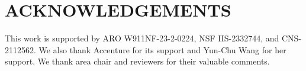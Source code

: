 \section{ACKNOWLEDGEMENTS\label{acknowledgement}}
This work is supported by ARO W911NF-23-2-0224, NSF IIS-2332744, and CNS-2112562. We also thank Accenture for its support and Yun-Chu Wang for her support. We thank area chair and reviewers for their valuable comments.

\begin{comment}
We demonstrated that Dynamically Selected Anterograde Amnesia offers the best trade-off among methods like Error Injection, Empty Response, Unlearning, and DEPN for protecting phone numbers, based on PII risk score and exact match score. It also excels in safeguarding physical addresses. We found that Sensitivity Analysis, Selected Unlearning, and Error Injection are all indispensable steps. Our work improves the PII risk score when more than one index is selected for forgetting, but selecting too many indexes deteriorates model performance. The break-even point for unlearning is between 200 and 400 data points. Overall, it effectively protects PII while maintaining model performance.
\end{comment}


\begin{comment}
\textbf{Limitation and Future work.}
Our study utilized the LLaMA2-7b model, chosen for its strong generalization capabilities and due to computational constraints. The experiments were performed using the Enron email dataset, widely acknowledged as suitable for data extraction attack studies. Future research will focus on theoretical analysis to determine how PII is stored within LLM. Enhancing our comprehension of LLMs' ``memorization'' phenomena will aid in protecting PII without compromising model performance.
\end{comment}

